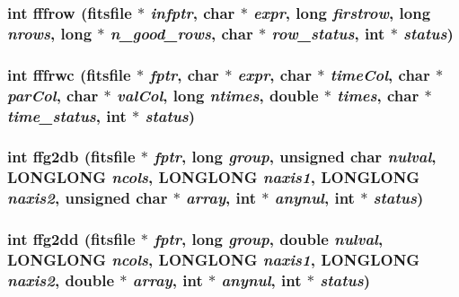 \subsubsection{\setlength{\rightskip}{0pt plus 5cm}int fffrow (\bf{fitsfile} $\ast$ {\em infptr}, char $\ast$ {\em expr}, long {\em firstrow}, long {\em nrows}, long $\ast$ {\em n\_\-good\_\-rows}, char $\ast$ {\em row\_\-status}, int $\ast$ {\em status})}\label{src_2fitsio_8h_1fc72ca968d2f0b3c5ccbe7bc1f96ff2}


\subsubsection{\setlength{\rightskip}{0pt plus 5cm}int fffrwc (\bf{fitsfile} $\ast$ {\em fptr}, char $\ast$ {\em expr}, char $\ast$ {\em time\-Col}, char $\ast$ {\em par\-Col}, char $\ast$ {\em val\-Col}, long {\em ntimes}, double $\ast$ {\em times}, char $\ast$ {\em time\_\-status}, int $\ast$ {\em status})}\label{src_2fitsio_8h_8e8b1193adf49702fb19fac2df2e93af}


\subsubsection{\setlength{\rightskip}{0pt plus 5cm}int ffg2db (\bf{fitsfile} $\ast$ {\em fptr}, long {\em group}, unsigned char {\em nulval}, \bf{LONGLONG} {\em ncols}, \bf{LONGLONG} {\em naxis1}, \bf{LONGLONG} {\em naxis2}, unsigned char $\ast$ {\em array}, int $\ast$ {\em anynul}, int $\ast$ {\em status})}\label{src_2fitsio_8h_9e5a172cb3e0331883d7b9d5a0b21bf3}


\subsubsection{\setlength{\rightskip}{0pt plus 5cm}int ffg2dd (\bf{fitsfile} $\ast$ {\em fptr}, long {\em group}, double {\em nulval}, \bf{LONGLONG} {\em ncols}, \bf{LONGLONG} {\em naxis1}, \bf{LONGLONG} {\em naxis2}, double $\ast$ {\em array}, int $\ast$ {\em anynul}, int $\ast$ {\em status})}\label{src_2fitsio_8h_2ba3df578b1fb9e9ca065bc4fbc519c8}


